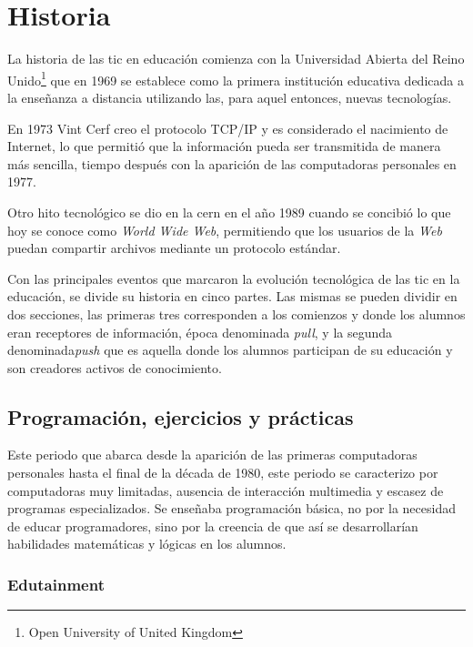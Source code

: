 \section{Historia}

La historia de las \Gls{tic} en educación comienza con la Universidad Abierta
del Reino Unido\footnote{Open University of United Kingdom} que en 1969 se
establece como la primera institución educativa dedicada a la enseñanza a
distancia utilizando las, para aquel entonces, nuevas
tecnologías\cite{tinio:ict}.

En 1973 Vint Cerf creo el protocolo TCP/IP y es considerado el nacimiento de
Internet\cite{white:ict}, lo que permitió que la información pueda ser
transmitida de manera más sencilla, tiempo después con la aparición de las
computadoras personales en 1977\cite{white:ict}. 

Otro hito tecnológico se dio en la \Gls{cern} en el año 1989 cuando se concibió
lo que hoy se conoce como \emph{World Wide Web}, permitiendo que los usuarios de
la \emph{Web} puedan compartir archivos mediante un protocolo
estándar\cite{white:ict}. 

Con las principales eventos que marcaron la evolución tecnológica de las
\Gls{tic} en la educación, se divide su historia en cinco partes. Las mismas se
pueden dividir en dos secciones, las primeras tres corresponden a los comienzos
y donde los alumnos eran receptores de información, época denominada
\emph{pull}, y la segunda denominada\emph{push}\cite{white:ict} que es aquella
donde los alumnos participan de su educación y son creadores activos de
conocimiento.

\subsection{Programación, ejercicios y prácticas}

Este periodo que abarca desde la aparición de las primeras computadoras
personales hasta el final de la década de 1980, este periodo se caracterizo por
computadoras muy limitadas, ausencia de interacción multimedia y escasez de
programas especializados. Se enseñaba programación básica\cite{leinonen:ict}, no
por la necesidad de educar programadores, sino por la creencia de que así se
desarrollarían habilidades matemáticas y lógicas en los alumnos. 


\subsubsection{Edutainment}

